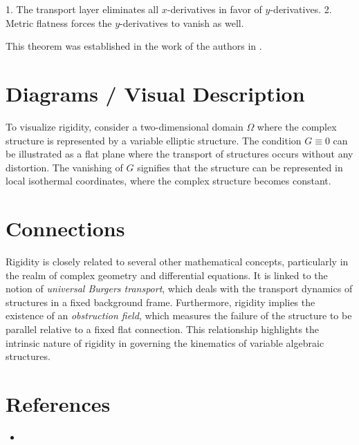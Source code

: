 \documentclass[11pt,a4paper]{article}
\begin{document}
1. The transport layer eliminates all $x$-derivatives in favor of $y$-derivatives.
2. Metric flatness forces the $y$-derivatives to vanish as well.

This theorem was established in the work of the authors in \cite{arxiv:2601.19274}.

\section{Diagrams / Visual Description}
To visualize rigidity, consider a two-dimensional domain $\Omega$ where the complex structure is represented by a variable elliptic structure. The condition $G \equiv 0$ can be illustrated as a flat plane where the transport of structures occurs without any distortion. The vanishing of $G$ signifies that the structure can be represented in local isothermal coordinates, where the complex structure becomes constant.

\section{Connections}
Rigidity is closely related to several other mathematical concepts, particularly in the realm of complex geometry and differential equations. It is linked to the notion of \textit{universal Burgers transport}, which deals with the transport dynamics of structures in a fixed background frame. Furthermore, rigidity implies the existence of an \textit{obstruction field}, which measures the failure of the structure to be parallel relative to a fixed flat connection. This relationship highlights the intrinsic nature of rigidity in governing the kinematics of variable algebraic structures.

\section{References}
\begin{itemize}
    \item \cite{arxiv:2601.19274}
\end{itemize}
\end{document}
